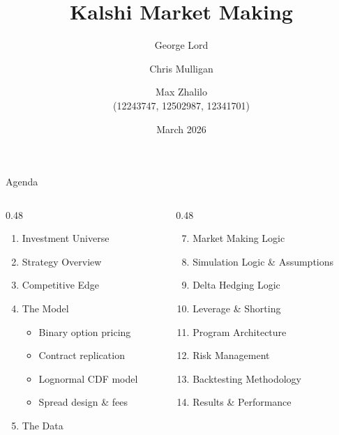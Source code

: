 \documentclass[aspectratio=169]{beamer}
\title{Kalshi Market Making}
\author{George Lord \and Chris Mulligan \and Max Zhalilo \\ (12243747, 12502987, 12341701)}
\institute{FINM 33150 --- Quantitative Trading Strategies}
\date{March 2026}
\begin{document}
\begin{frame}[plain]
  \titlepage
\end{frame}

\begin{frame}{Agenda}
  \begin{columns}[T]
    \begin{column}{0.48\textwidth}
      \begin{enumerate}
        \item Investment Universe
        \item Strategy Overview
        \item Competitive Edge
        \item The Model
              \begin{itemize}\small
                \item Binary option pricing
                \item Contract replication
                \item Lognormal CDF model
                \item Spread design \& fees
              \end{itemize}
        \item The Data
      \end{enumerate}
    \end{column}
    \begin{column}{0.48\textwidth}
      \begin{enumerate}
        \setcounter{enumi}{6}
        \item Market Making Logic
        \item Simulation Logic \& Assumptions
        \item Delta Hedging Logic
        \item Leverage \& Shorting
        \item Program Architecture
        \item Risk Management
        \item Backtesting Methodology
        \item Results \& Performance
      \end{enumerate}
    \end{column}
  \end{columns}
\end{frame}
\end{document}

